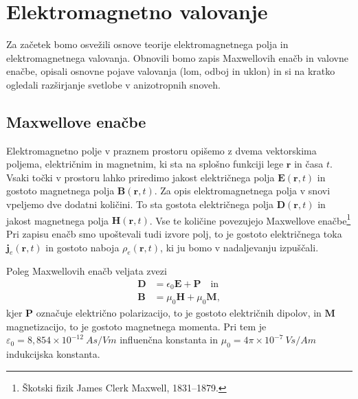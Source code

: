 
\chapter{Elektromagnetno valovanje}
Za začetek bomo osvežili osnove teorije elektromagnetnega polja in 
elektromagnetnega valovanja. Obnovili bomo zapis Maxwellovih enačb in 
valovne enačbe, opisali osnovne pojave valovanja (lom, odboj in uklon)
in si na kratko ogledali razširjanje svetlobe v anizotropnih snoveh.

\section{Maxwellove enačbe}
Elektromagnetno polje v praznem prostoru opišemo z dvema vektorskima
poljema, električnim in magnetnim, ki sta na splošno funkciji lege $\mathbf{r}$
in časa $t$. Vsaki točki v prostoru lahko priredimo jakost
električnega polja $\mathbf{E}(\mathbf{r},t)$ in gostoto
magnetnega polja $\mathbf{B}(\mathbf{r},t)$. Za opis elektromagnetnega
polja v snovi vpeljemo dve dodatni količini. To sta gostota
električnega polja $\mathbf{D}(\mathbf{r},t)$ in jakost magnetnega
polja $\mathbf{H}(\mathbf{r},t)$.
Vse te količine povezujejo Maxwellove
enačbe\footnote{Škotski fizik James Clerk Maxwell, 1831--1879.}
\\
Pri zapisu enačb smo upoštevali tudi izvore polj, to je gostoto
električnega toka $\mathbf{j}_e(\mathbf{r},t)$ in gostoto naboja $\rho_{e}(\mathbf{r},t)$, ki 
ju bomo v nadaljevanju izpuščali.

Poleg Maxwellovih enačb veljata zvezi
\begin{align}
\mathbf{D} & =\epsilon_{0}\mathbf{E}+\mathbf{P} \quad \mathrm{in}\\
\mathbf{B} & =\mu_{0}\mathbf{H}+\mu_{0}\mathbf{M},
\end{align}
kjer $\mathbf{P}$ označuje električno
polarizacijo, to je gostoto električnih dipolov, in  $\mathbf{M}$
magnetizacijo, to je gostoto magnetnega momenta. Pri tem je $\varepsilon_0 = 
8,854 \times 10^{-12}~\si{As/Vm}$ influenčna konstanta in $\mu_0 = 
4 \pi \times 10^{-7}~\si{Vs/Am}$ indukcijska konstanta.

